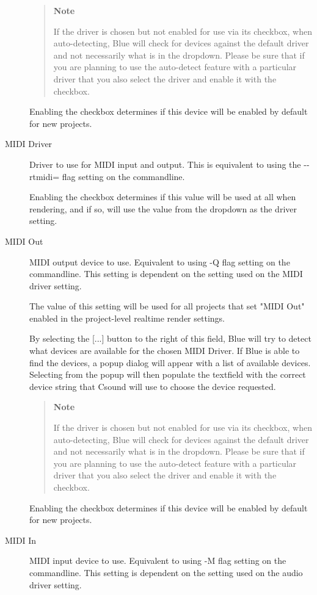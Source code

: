 \begin{description}
\begin{quote}
\textbf{Note}

If the driver is chosen but not enabled for use via its checkbox, when
auto-detecting, Blue will check for devices against the default driver
and not necessarily what is in the dropdown. Please be sure that if you
are planning to use the auto-detect feature with a particular driver
that you also select the driver and enable it with the checkbox.
\end{quote}

Enabling the checkbox determines if this device will be enabled by
default for new projects.
\item[MIDI Driver]
Driver to use for MIDI input and output. This is equivalent to using the
-\/-rtmidi= flag setting on the commandline.

Enabling the checkbox determines if this value will be used at all when
rendering, and if so, will use the value from the dropdown as the driver
setting.
\item[MIDI Out]
MIDI output device to use. Equivalent to using -Q flag setting on the
commandline. This setting is dependent on the setting used on the MIDI
driver setting.

The value of this setting will be used for all projects that set "MIDI
Out" enabled in the project-level realtime render settings.

By selecting the {[}...{]} button to the right of this field, Blue will
try to detect what devices are available for the chosen MIDI Driver. If
Blue is able to find the devices, a popup dialog will appear with a list
of available devices. Selecting from the popup will then populate the
textfield with the correct device string that Csound will use to choose
the device requested.

\begin{quote}
\textbf{Note}

If the driver is chosen but not enabled for use via its checkbox, when
auto-detecting, Blue will check for devices against the default driver
and not necessarily what is in the dropdown. Please be sure that if you
are planning to use the auto-detect feature with a particular driver
that you also select the driver and enable it with the checkbox.
\end{quote}

Enabling the checkbox determines if this device will be enabled by
default for new projects.
\item[MIDI In]
MIDI input device to use. Equivalent to using -M flag setting on the
commandline. This setting is dependent on the setting used on the audio
driver setting.


\end{description}
